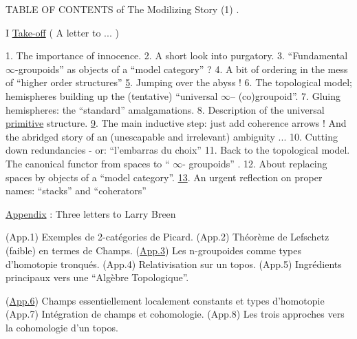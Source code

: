 

TABLE OF CONTENTS of The Modilizing Story (1) .

I \uline{Take-off} ( A letter to ... )

1. The importance of innocence.
2. A short look into purgatory.
3. ``Fundamental $\infty$-groupoids'' as objects of a ``model category'' ?
4. A bit of ordering in the mess of ``higher order structures''
\uline{5}. Jumping over the abyss !
6. The topological model; hemispheres building up the (tentative)
``universal $\infty$-- (co)groupoid''.
7. Gluing hemispheres: the ``standard'' amalgamations.
8. Description of the universal \uline{primitive} structure.
\uline{9}. The main inductive step: just add coherence arrows ! And the
abridged story of an (unescapable and irrelevant) ambiguity ...
10. Cutting down redundancies - or: ``l'embarras du choix''
\unsure{\hand{\textasciicircum}}11. Back to the topological model. The canonical functor from
spaces to `` $\infty$- groupoids'' .
12. About replacing spaces by objects of a ``model category''.
\uline{13}. An urgent reflection on proper names: ``stacks'' and ``coherators''

\uline{Appendix} : Three letters to Larry Breen

(App.1) Exemples de 2-catégories de Picard.
(App.2)  Théorème de Lefschetz (faible) en termes de \hand{(}Champs.\hand{)}
(\uline{App.3}) Les n-groupoides comme types d'homotopie tronqués.
(App.4) Relativisation sur un topos.
(App.5) Ingrédients principaux vers une ``Algèbre Topologique''.

(\uline{App.6}) Champs essentiellement localement constants et types d'homoto\hand{(}pie
(App.7) Intégration de champs et cohomologie.
(App.8) Les trois approches vers la cohomologie d'un topos.

